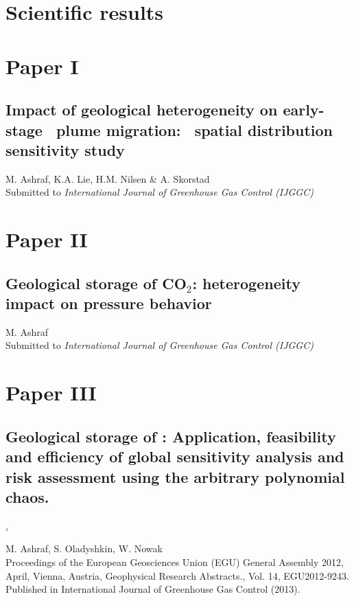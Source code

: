\chapter{Scientific results}

\pagebreak

\chapter*{Paper I}
\section{Impact of geological heterogeneity on early-stage \coo\ plume migration: \coo\
spatial distribution sensitivity study}

\noindent M. Ashraf, K.A. Lie, H.M. Nilsen \& A.
Skorstad\\

\noindent Submitted to \textit{International Journal of Greenhouse Gas Control
(IJGGC)}
\cleardoublepage




\chapter*{Paper II}
\section{Geological storage of CO$_2$: heterogeneity impact on pressure
behavior}

\noindent M. Ashraf\\

\noindent Submitted to \textit{International Journal of Greenhouse Gas Control
(IJGGC)}
\cleardoublepage



\chapter*{Paper III}
\section{Geological storage of \coo: Application, feasibility and efficiency of global sensitivity analysis and risk assessment using the arbitrary polynomial chaos.}, 


\noindent M. Ashraf, S. Oladyshkin, W. Nowak\\

\noindent Proceedings of the European Geosciences Union (EGU) General Assembly 2012, April, Vienna, Austria, Geophysical Research Abstracts., Vol. 14, EGU2012-9243. Published in International Journal of Greenhouse Gas Control (2013).
\cleardoublepage

